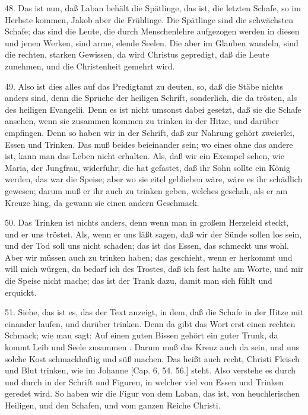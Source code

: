 48. Das ist nun, daß Laban behält die Spätlinge, das ist, die letzten Schafe, so im Herbste kommen, Jakob aber die Frühlinge. Die Spätlinge sind die schwächsten Schafe; das sind die Leute, die durch Menschenlehre aufgezogen werden in diesen und jenen Werken, sind arme, elende Seelen. Die aber im Glauben wandeln, sind die rechten, starken Gewissen, da wird Christus gepredigt, daß die Leute zunehmen, und die Christenheit gemehrt wird.

49. Also ist dies alles auf das Predigtamt zu deuten, so, daß die Stäbe nichts anders sind, denn die Sprüche der heiligen Schrift, sonderlich, die da trösten, als des heiligen Evangelii. Denn es ist nicht umsonst dabei gesetzt, daß sie die Schafe ansehen, wenn sie zusammen kommen zu trinken in der Hitze, und darüber empfingen. Denn so haben wir in der Schrift, daß zur Nahrung gehört zweierlei, Essen und Trinken. Das muß beides beieinander sein; wo eines ohne das andere ist, kann man das Leben nicht erhalten. Als, daß wir ein Exempel sehen, wie Maria, der Jungfrau, widerfuhr; die hat gefastet, daß ihr Sohn sollte ein König werden, das war die Speise; aber wo sie eitel geblieben wäre, wäre es ihr schädlich gewesen; darum muß er ihr auch zu trinken geben, welches geschah, als er am Kreuze hing, da gewann sie einen andern Geschmack.

50. Das Trinken ist nichts anders, denn wenn man in großem Herzeleid steckt, und er uns tröstet. Als, wenn er uns läßt sagen, daß wir der Sünde sollen los sein, und der Tod soll uns nicht schaden; das ist das Essen, das schmeckt uns wohl. Aber wir müssen auch zu trinken haben; das geschieht, wenn er herkommt und will mich würgen, da bedarf ich des Trostes, daß ich fest halte am Worte, und mir die Speise nicht mache; das ist der Trank dazu, damit man sich fühlt und erquickt.

51. Siehe, das ist es, das der Text anzeigt, in dem, daß die Schafe in der Hitze mit einander laufen, und darüber trinken. Denn da gibt das Wort erst einen rechten Schmack; wie man sagt: Auf einen guten Bissen gehört ein guter Trunk, da kommt Leib und Seele zusammen
. Darum muß das Kreuz auch da sein, und uns solche Kost schmackhaftig und süß machen. Das heißt auch recht, Christi Fleisch und Blut trinken, wie im Johanne [Cap. 6, 54. 56.] steht. Also verstehe es durch und durch in der Schrift und Figuren, in welcher viel von Essen und Trinken geredet wird. So haben wir die Figur von dem Laban, das ist, von heuchlerischen Heiligen, und den Schafen, und vom ganzen Reiche Christi.

